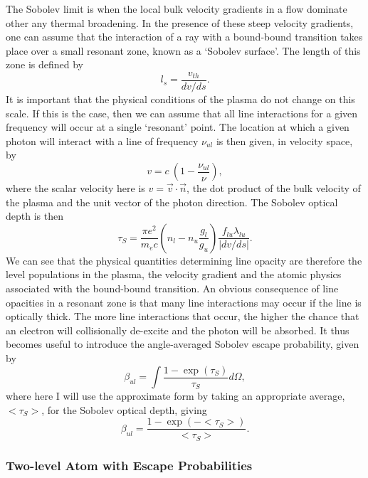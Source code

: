 The Sobolev limit is when the local bulk velocity gradients in a flow 
dominate other any thermal broadening. In the presence of these steep
velocity gradients, one can assume that the interaction of a ray with a bound-bound
transition takes place over a small resonant zone, known as a 
`Sobolev surface'. The length of this zone is defined by
\begin{equation}
l_s = \frac{v_{th}}{dv / ds}.
\end{equation}
It is important that the physical conditions of the plasma do not change on this scale.
If this is the case, then we can assume that all line interactions for a given 
frequency will occur at a single `resonant' point. The location at which
a given photon will interact with a line of frequency $\nu_{ul}$
is then given, in velocity space, by
\begin{equation}
v = c~\left(1 - \frac{\nu_{ul}}{\nu}\right),
\label{eq:resonance}
\end{equation}
where the scalar velocity here is $v=\vec{v}\cdot \vec{n}$, 
the dot product of the bulk velocity of the plasma
and the unit vector of the photon direction. 
The Sobolev optical depth is then
\begin{equation}
\tau_S = \frac{\pi e^2}{m_e c}  \left(n_l - n_u \frac{g_l}{g_u} \right) \frac{f_{lu} \lambda_{lu}}{| dv / ds |}.
\label{eq:tau_sob}
\end{equation}
We can see that the physical quantities determining line opacity are therefore 
the level populations in the plasma, the velocity gradient and the atomic physics
associated with the bound-bound transition. An obvious consequence of line opacities
in a resonant zone is that many line interactions may occur if the line is
optically thick. The more line interactions that occur, the higher the chance
that an electron will collisionally de-excite and the photon will be absorbed.
It thus becomes useful to introduce the angle-averaged Sobolev escape probability,
given by
\begin{equation}
\beta_{ul} = \int \frac{1 - \exp(\tau_S)}{\tau_S} d\Omega,
\label{eq:beta_sob}
\end{equation}
where here I will use the approximate form by taking an appropriate
average, $<\tau_S>$, for the Sobolev optical depth, giving 
\begin{equation}
\beta_{ul} = \frac{1 - \exp(-<\tau_S>)}{<\tau_S>}.
\label{eq:beta_sob}
\end{equation}


\subsubsection{Two-level Atom with Escape Probabilities}

